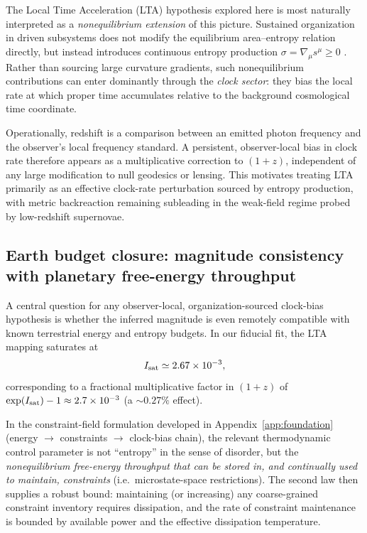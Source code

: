 \documentclass[10pt]{article}
\begin{document}
The Local Time Acceleration (LTA) hypothesis explored here is most naturally interpreted as a
\emph{nonequilibrium extension} of this picture. Sustained organization in driven subsystems does not
modify the equilibrium area--entropy relation directly, but instead introduces continuous entropy
production $\sigma = \nabla_\mu s^\mu \ge 0$ \cite{ElingGuedensJacobson2006Noneq}. Rather than sourcing
large curvature gradients, such nonequilibrium contributions can enter dominantly through the
\emph{clock sector}: they bias the local rate at which proper time accumulates relative to the
background cosmological time coordinate.

Operationally, redshift is a comparison between an emitted photon frequency and the observer’s local
frequency standard. A persistent, observer-local bias in clock rate therefore appears as a
multiplicative correction to $(1+z)$, independent of any large modification to null geodesics or
lensing. This motivates treating LTA primarily as an effective clock-rate perturbation sourced by
entropy production, with metric backreaction remaining subleading in the weak-field regime probed by
low-redshift supernovae.

\subsection{Earth budget closure: magnitude consistency with planetary free-energy throughput}
\label{sec:earth_budget_closure}

A central question for any observer-local, organization-sourced clock-bias hypothesis is whether
the inferred magnitude is even remotely compatible with known terrestrial energy and entropy
budgets. In our fiducial fit, the LTA mapping saturates at
\begin{equation}
I_{\rm sat} \simeq 2.67\times 10^{-3},
\end{equation}
corresponding to a fractional multiplicative factor in \((1+z)\) of
\(\exp(I_{\rm sat})-1 \approx 2.7\times 10^{-3}\) (a \(\sim 0.27\%\) effect).

In the constraint-field formulation developed in Appendix~\ref{app:foundation}
(energy \(\rightarrow\) constraints \(\rightarrow\) clock-bias chain),
the relevant thermodynamic control parameter is not ``entropy'' in the sense of disorder, but the
\emph{nonequilibrium free-energy throughput that can be stored in, and continually used to maintain,
constraints} (i.e.\ microstate-space restrictions). The second law then supplies a robust bound:
maintaining (or increasing) any coarse-grained constraint inventory requires dissipation, and the
rate of constraint maintenance is bounded by available power and the effective dissipation
temperature.
\end{document}
